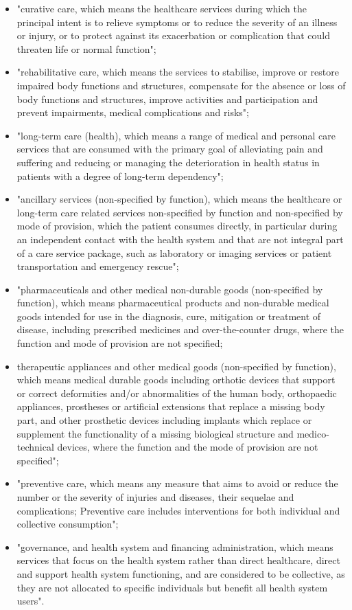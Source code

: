 \documentclass{article}
\begin{document}
\begin{enumerate}
\begin{itemize}
\item "curative care, which means the healthcare services during which the principal intent is to relieve symptoms or to reduce the severity of an illness or injury, or to protect against its exacerbation or complication that could threaten life or normal function";
\item "rehabilitative care, which means the services to stabilise, improve or restore impaired body functions and structures, compensate for the absence or loss of body functions and structures, improve activities and participation and prevent impairments, medical complications and risks";
\item "long-term care (health), which means a range of medical and personal care services that are consumed with the primary goal of alleviating pain and suffering and reducing or managing the deterioration in health status in patients with a degree of long-term dependency";
\item "ancillary services (non-specified by function), which means the healthcare or long-term care related services non-specified by function and non-specified by mode of provision, which the patient consumes directly, in particular during an independent contact with the health system and that are not integral part of a care service package, such as laboratory or imaging services or patient transportation and emergency rescue";
\item "pharmaceuticals and other medical non-durable goods (non-specified by function), which means pharmaceutical products and non-durable medical goods intended for use in the diagnosis, cure, mitigation or treatment of disease, including prescribed medicines and over-the-counter drugs, where the function and mode of provision are not specified;
\item therapeutic appliances and other medical goods (non-specified by function), which means medical durable goods including orthotic devices that support or correct deformities and/or abnormalities of the human body, orthopaedic appliances, prostheses or artificial extensions that replace a missing body part, and other prosthetic devices including implants which replace or supplement the functionality of a missing biological structure and medico-technical devices, where the function and the mode of provision are not specified";
\item "preventive care, which means any measure that aims to avoid or reduce the number or the severity of injuries and diseases, their sequelae and complications; Preventive care includes interventions for both individual and collective consumption";
\item "governance, and health system and financing administration, which means services that focus on the health system rather than direct healthcare, direct and support health system functioning, and are considered to be collective, as they are not allocated to specific individuals but benefit all health system users".
\end{itemize}


\end{enumerate}
\end{document}

